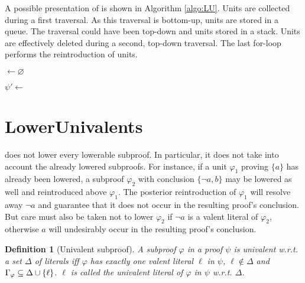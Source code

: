 \documentclass{easychair}
\newtheorem{definition}{Definition}
\begin{document}
A possible presentation of {\LowerUnits} is shown in Algorithm \ref{algo:LU}. Units are collected
during a first traversal. As this traversal is bottom-up, units are stored in a queue. The traversal
could have been top-down and units stored in a stack. Units are effectively deleted during a second,
top-down traversal. The last for-loop performs the reintroduction of units.

\begin{algorithm}[bt]
  \BlankLine

  \Units $\leftarrow \varnothing$ \;
  \BlankLine

  \BlankLine

  $\psi' \leftarrow $ \Rec{$\psi$,$\Units$} \;
  \BlankLine


  \caption{\LowerUnits}
  \label{algo:LU}
\end{algorithm}




\section{LowerUnivalents} \label{sec:LUniv}

{\LowerUnits} does not lower every lowerable subproof. In particular, it does not take into
account the already lowered subproofs. For instance, if a unit $\varphi_1$ proving $\{a\}$ has
already been lowered, a subproof $\varphi_2$ with conclusion $\{\neg a, b\}$ may be lowered as well and
reintroduced above $\varphi_1$. The posterior reintroduction of $\varphi_1$ will resolve away $\neg a$ and guarantee that it does not occur in the resulting proof's conclusion. But care must also be taken not to lower $\varphi_2$ if $\neg a$ is a valent literal of
$\varphi_2$, otherwise $a$ will undesirably occur in the resulting proof's conclusion.

\begin{definition}[Univalent subproof]
A subproof $\varphi$ in a proof $\psi$ is \emph{univalent} w.r.t. a set $\Delta$ of literals iff
$\varphi$ has exactly one valent literal $\ell$ in $\psi$, $\ell \notin \Delta$ and
$\Gamma_{\varphi} \subseteq \Delta \cup \left\{ \ell \right\}$. $\ell$ is called the \emph{univalent
literal} of $\varphi$ in $\psi$ w.r.t.  $\Delta$.
\end{definition}
\end{document}
